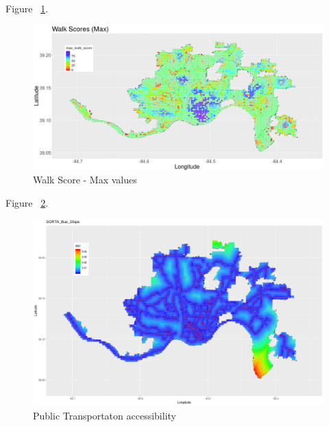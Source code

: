 \documentclass{llncs}
\begin{document}
Figure ~\ref{figure : maxWalkScores}. \newline
\FloatBarrier
\begin{figure}
 	\includegraphics[width=\textwidth, height=\textheight, keepaspectratio]{maxWalkScores.png}
 	\caption{Walk Score - Max values}
	\label{figure : maxWalkScores}
\end{figure}
\FloatBarrier


Figure ~\ref{figure : busStopDistance}. \newline
\FloatBarrier
\begin{figure}
 	\includegraphics[width=\textwidth, height=\textheight, keepaspectratio]{busStopDistance.png}
 	\caption{Public Transportaton accessibility}
	\label{figure : busStopDistance}
\end{figure}
\FloatBarrier
\end{document}
